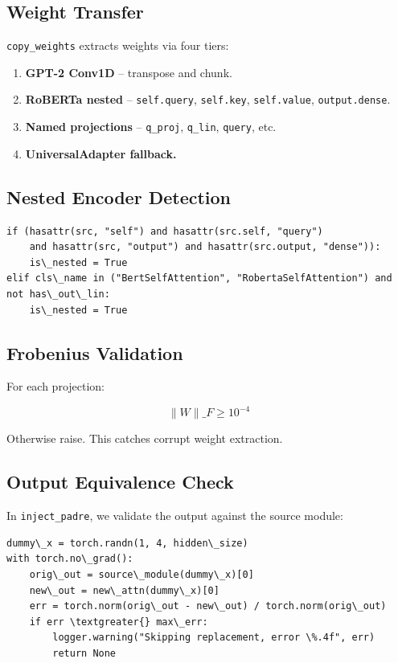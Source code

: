 \subsection{Weight Transfer}

\texttt{copy\_weights} extracts weights via four tiers:

\begin{enumerate}
\item \textbf{GPT-2 Conv1D} -- transpose and chunk.
\item \textbf{RoBERTa nested} -- \texttt{self.query}, \texttt{self.key}, \texttt{self.value}, \texttt{output.dense}.
\item \textbf{Named projections} -- \texttt{q\_proj}, \texttt{q\_lin}, \texttt{query}, etc.
\item \textbf{UniversalAdapter fallback.}

\end{enumerate}
\subsection{Nested Encoder Detection}

\begin{lstlisting}
if (hasattr(src, "self") and hasattr(src.self, "query")
    and hasattr(src, "output") and hasattr(src.output, "dense")):
    is\_nested = True
elif cls\_name in ("BertSelfAttention", "RobertaSelfAttention") and not has\_out\_lin:
    is\_nested = True
\end{lstlisting}

\subsection{Frobenius Validation}

For each projection:

\[
\|W\|\_F \geq 10^{-4}
\tag{5.1}
\]

Otherwise raise. This catches corrupt weight extraction.

\subsection{Output Equivalence Check}

In \texttt{inject\_padre}, we validate the output against the source module:

\begin{lstlisting}
dummy\_x = torch.randn(1, 4, hidden\_size)
with torch.no\_grad():
    orig\_out = source\_module(dummy\_x)[0]
    new\_out = new\_attn(dummy\_x)[0]
    err = torch.norm(orig\_out - new\_out) / torch.norm(orig\_out)
    if err \textgreater{} max\_err:
        logger.warning("Skipping replacement, error \%.4f", err)
        return None
\end{lstlisting}


